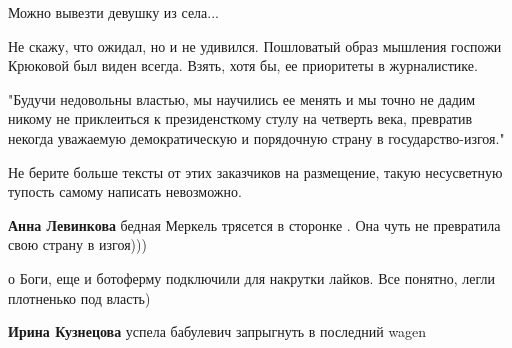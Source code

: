 \begin{itemize}
\begin{itemize}
Можно вывезти девушку из села...

 
Не скажу, что ожидал, но и не удивился. Пошловатый образ мышления госпожи Крюковой был виден всегда. Взять, хотя бы, ее приоритеты в журналистике.

\end{itemize}

 

"Будучи недовольны властью, мы научились ее менять и мы точно не дадим никому
не приклеиться к президенсткому стулу на четверть века, превратив некогда
уважаемую демократическую и порядочную страну в государство-изгоя."

Не берите больше тексты от этих заказчиков на размещение, такую несусветную
тупость самому написать невозможно.

\begin{itemize}
 
\textbf{Анна Левинкова} бедная Меркель трясется в сторонке . Она чуть не превратила свою страну в изгоя)))🤣

 
о Боги, еще и ботоферму подключили для накрутки лайков. Все понятно, легли плотненько под власть)

 
\textbf{Ирина Кузнецова} успела бабулевич запрыгнуть в последний wagen

 

\end{itemize}
\end{itemize}
